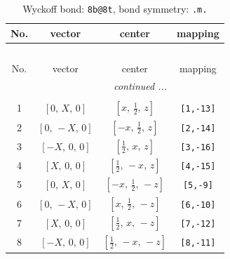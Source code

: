 \documentclass[fleqn,8pt]{jsarticle}
\begin{document}
\begin{longtable}{cccc}
\caption{Wyckoff bond: {\tt 8b@8t}, bond symmetry: {\tt .m.}}
 \\
 \hline \hline
No. & vector & center & mapping \\ \hline \endfirsthead

\multicolumn{3}{l}{\tablename\ \thetable{}} \\
 \hline \hline
No. & vector & center & mapping \\ \hline \endhead

 \hline \hline
\multicolumn{3}{r}{\footnotesize\it continued ...} \\ \endfoot

 \hline \hline
\multicolumn{3}{r}{} \\ \endlastfoot

1 & $\left[ 0,\, X,\, 0 \right]$ & $\left[ x,\, \frac{1}{2},\, z \right]$ & {\tt [1,-13]} \\ \hline
2 & $\left[ 0,\, - X,\, 0 \right]$ & $\left[ - x,\, \frac{1}{2},\, z \right]$ & {\tt [2,-14]} \\ \hline
3 & $\left[ - X,\, 0,\, 0 \right]$ & $\left[ \frac{1}{2},\, x,\, z \right]$ & {\tt [3,-16]} \\ \hline
4 & $\left[ X,\, 0,\, 0 \right]$ & $\left[ \frac{1}{2},\, - x,\, z \right]$ & {\tt [4,-15]} \\ \hline
5 & $\left[ 0,\, X,\, 0 \right]$ & $\left[ - x,\, \frac{1}{2},\, - z \right]$ & {\tt [5,-9]} \\ \hline
6 & $\left[ 0,\, - X,\, 0 \right]$ & $\left[ x,\, \frac{1}{2},\, - z \right]$ & {\tt [6,-10]} \\ \hline
7 & $\left[ X,\, 0,\, 0 \right]$ & $\left[ \frac{1}{2},\, x,\, - z \right]$ & {\tt [7,-12]} \\ \hline
8 & $\left[ - X,\, 0,\, 0 \right]$ & $\left[ \frac{1}{2},\, - x,\, - z \right]$ & {\tt [8,-11]} \\
\end{longtable}
\renewcommand{\arraystretch}{1.2}
\end{document}
